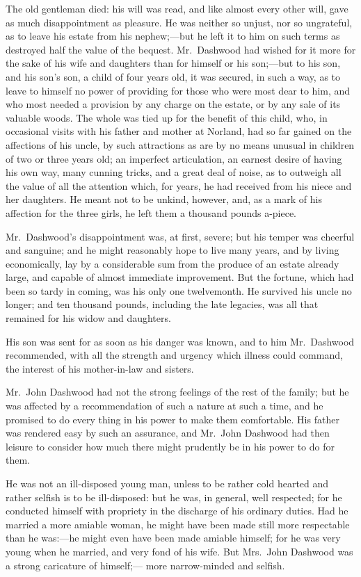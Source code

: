 The old gentleman died: his will was read, and
like almost every other will, gave as much disappointment
as pleasure.  He was neither so unjust, nor so ungrateful,
as to leave his estate from his nephew;---but he left it to him
on such terms as destroyed half the value of the bequest.
Mr.\ Dashwood had wished for it more for the sake of his
wife and daughters than for himself or his son;---but to
his son, and his son's son, a child of four years old,
it was secured, in such a way, as to leave to himself
no power of providing for those who were most dear
to him, and who most needed a provision by any charge
on the estate, or by any sale of its valuable woods.
The whole was tied up for the benefit of this child, who,
in occasional visits with his father and mother at Norland,
had so far gained on the affections of his uncle,
by such attractions as are by no means unusual in children
of two or three years old; an imperfect articulation,
an earnest desire of having his own way, many cunning tricks,
and a great deal of noise, as to outweigh all the value
of all the attention which, for years, he had received
from his niece and her daughters.  He meant not to
be unkind, however, and, as a mark of his affection
for the three girls, he left them a thousand pounds a-piece.

Mr.\ Dashwood's disappointment was, at first, severe;
but his temper was cheerful and sanguine; and he might
reasonably hope to live many years, and by living economically,
lay by a considerable sum from the produce of an estate
already large, and capable of almost immediate improvement.
But the fortune, which had been so tardy in coming, was his
only one twelvemonth.  He survived his uncle no longer;
and ten thousand pounds, including the late legacies,
was all that remained for his widow and daughters.

His son was sent for as soon as his danger was known,
and to him Mr.\ Dashwood recommended, with all the strength
and urgency which illness could command, the interest
of his mother-in-law and sisters.

Mr.\ John Dashwood had not the strong feelings of the
rest of the family; but he was affected by a recommendation
of such a nature at such a time, and he promised to do
every thing in his power to make them comfortable.
His father was rendered easy by such an assurance,
and Mr.\ John Dashwood had then leisure to consider how
much there might prudently be in his power to do for them.

He was not an ill-disposed young man, unless to
be rather cold hearted and rather selfish is to be
ill-disposed: but he was, in general, well respected;
for he conducted himself with propriety in the discharge
of his ordinary duties.  Had he married a more amiable woman,
he might have been made still more respectable than he
was:---he might even have been made amiable himself; for he
was very young when he married, and very fond of his wife.
But Mrs.\ John Dashwood was a strong caricature of himself;---%
more narrow-minded and selfish.

